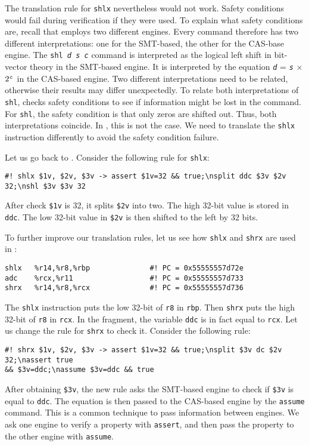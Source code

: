 \documentclass{amsproc}
\begin{document}
The translation rule for \texttt{shlx} nevertheless would not
work. Safety conditions would fail during verification if they were
used. To explain what safety conditions are, recall that \cryptoline
employs two different engines. Every \cryptoline command therefore has
two different interpretations: one for the SMT-based, the other for
the CAS-base engine. The \texttt{shl \textit{d} \textit{s} \textit{c}}
command is interpreted as the logical left shift in bit-vector theory
in the SMT-based engine. It is interpreted by the equation 
\texttt{\textit{d}} = \texttt{\textit{s}} $\times$
$2^{\texttt{\textit{c}}}$ in the CAS-based engine. Two different
interpretations need to be related, otherwise their results may differ
unexpectedly. To relate both interpretations of \texttt{shl},
\cryptoline checks safety conditions to see if information
might be lost in the command. For \texttt{shl}, the safety condition
is that only zeros are shifted out. Thus, both interpretations
coincide. In \nistzmul, this is not the case. We need to translate the
\xeightysix \texttt{shlx} instruction differently to avoid the safety
condition failure.

Let us go back to \nistzmulgas. Consider the following rule for
\texttt{shlx}:
\begin{verbatim}
#! shlx $1v, $2v, $3v -> assert $1v=32 && true;\nsplit ddc $3v $2v 32;\nshl $3v $3v 32
\end{verbatim}
After check \texttt{\$1v} is 32, it splits \texttt{\$2v} into two. The
high 32-bit value is stored in \texttt{ddc}. The low 32-bit value in
\texttt{\$2v} is then shifted to the left by 32 bits. 

To further improve our translation rules, let us see how \texttt{shlx}
and \texttt{shrx} are used in \nistzmulgas:
\begin{verbatim}
shlx   %r14,%r8,%rbp              #! PC = 0x55555557d72e
adc    %rcx,%r11                  #! PC = 0x55555557d733
shrx   %r14,%r8,%rcx              #! PC = 0x55555557d736
\end{verbatim}
The \texttt{shlx} instruction puts the low 32-bit of \texttt{r8} in
\texttt{rbp}. Then \texttt{shrx} puts the high 32-bit of \texttt{r8}
in \texttt{rcx}. In the \cryptoline fragment, the variable
\texttt{ddc} is in fact equal to \texttt{rcx}. Let us change the rule
for \texttt{shrx} to check it. Consider the following rule:
\begin{verbatim}
#! shrx $1v, $2v, $3v -> assert $1v=32 && true;\nsplit $3v dc $2v 32;\nassert true 
&& $3v=ddc;\nassume $3v=ddc && true
\end{verbatim}
After obtaining \texttt{\$3v}, the new rule asks the SMT-based engine
to check if \texttt{\$3v} is equal to \texttt{ddc}. The equation is
then passed to the CAS-based engine by the \cryptoline \texttt{assume}
command. This is a common technique to pass information between
engines. We ask one engine to verify a property with \texttt{assert},
and then pass the property to the other engine with \texttt{assume}.
\end{document}

